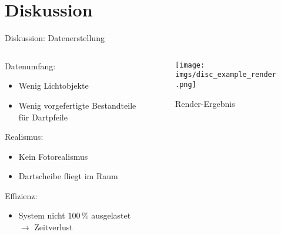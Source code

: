 
\section{Diskussion}

\begin{frame}{Diskussion: Datenerstellung}
    \begin{columns}
        \begin{column}{0.7\linewidth}

            Datenumfang:\\
            \begin{itemize}
                \item Wenig Lichtobjekte
                \item Wenig vorgefertigte Bestandteile für Dartpfeile
            \end{itemize}

            Realismus:\\
            \begin{itemize}
                \item Kein Fotorealismus
                \item Dartscheibe fliegt im Raum
            \end{itemize}

            Effizienz:\\
            \begin{itemize}
                \item System nicht $100\,\%$ ausgelastet $\rightarrow$ Zeitverlust
            \end{itemize}

        \end{column}
        \begin{column}{0.3\linewidth}

            \begin{figure}
                \centering
                \texttt{[image: imgs/disc\_example\_render.png]}
                \caption{Render-Ergebnis}
            \end{figure}

        \end{column}
    \end{columns}
\end{frame}

